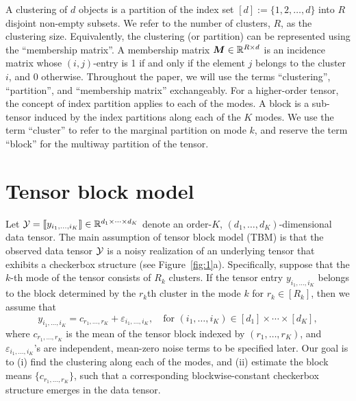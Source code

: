 \documentclass{article}
\begin{document}
A clustering of $d$ objects is a partition of the index set $[d]:=\{1,2,\ldots,d\}$ into $R$ disjoint non-empty subsets. We refer to the number of clusters, $R$, as the clustering size. Equivalently, the clustering (or partition) can be represented using the ``membership matrix''. A membership matrix $\bm M\in\mathbb{R}^{R\times d}$ is an incidence matrix whose $(i,j)$-entry is 1 if and only if the element $j$ belongs to the cluster $i$, and 0 otherwise. Throughout the paper, we will use the terms ``clustering'', ``partition'', and ``membership matrix'' exchangeably. For a higher-order tensor, the concept of index partition applies to each of the modes. A block is a sub-tensor induced by the index partitions along each of the $K$ modes. We use the term ``cluster'' to refer to the marginal partition on mode $k$, and reserve the term ``block'' for the multiway partition of the tensor. 



\section{Tensor block model}

Let $\mathcal{Y}=\llbracket y_{i_1,\ldots,i_K} \rrbracket\in\mathbb{R}^{d_1\times \cdots\times d_K}$ denote an order-$K$, $(d_1,\ldots,d_K)$-dimensional data tensor. The main assumption of tensor block model (TBM) is that the observed data tensor $\mathcal{Y}$ is a noisy realization of an underlying tensor that exhibits a checkerbox structure (see Figure~\ref{fig:1}a). Specifically, suppose that the $k$-th mode of the tensor consists of $R_k$ clusters. If the tensor entry $y_{i_1,\ldots,i_K}$ belongs to the block determined by the $r_k$th cluster in the mode $k$ for $r_k\in[R_k]$, then we assume that 
\begin{equation}\label{eq:model}
y_{i_1,\ldots,i_K}=c_{r_1,\ldots,r_K}+\varepsilon_{i_1,\ldots,i_K},\quad \text{for }(i_1,\ldots,i_K)\in[d_1]\times\cdots\times [d_K],
\end{equation}
where $c_{r_1,\ldots,r_K}$ is the mean of the tensor block indexed by $(r_1,\ldots,r_K)$,  and $\varepsilon_{i_1,\ldots,i_K}$'s are independent, mean-zero noise terms to be specified later. Our goal is to (i) find the clustering along each of the modes, and (ii) estimate the block means $\{c_{r_1,\ldots,r_K}\}$, such that a corresponding blockwise-constant checkerbox structure emerges in the data tensor. 
\end{document}
